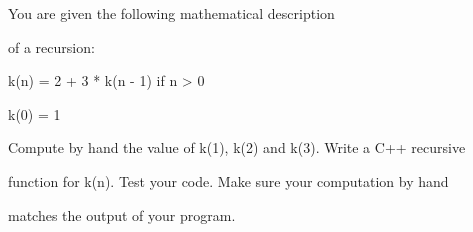 You are given the following mathematical description

of a recursion:



k(n) = 2 + 3 * k(n - 1) if n > 0



k(0) = 1



Compute by hand the value of k(1), k(2) and k(3). Write a C++ recursive

function for k(n). Test your code. Make sure your computation by hand

matches the output of your program.

